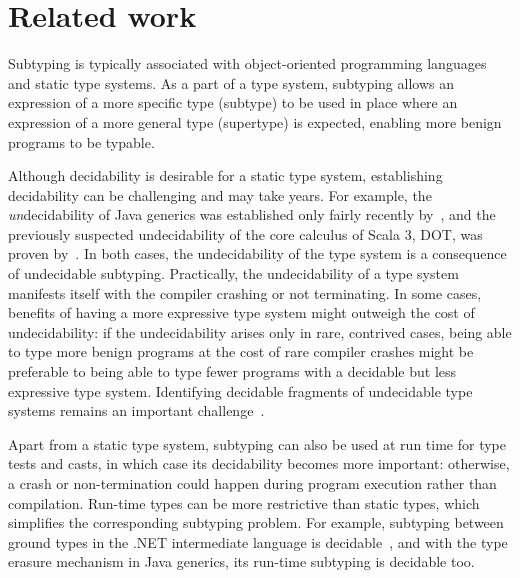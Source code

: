 \chapter{Related work}\label{chap:5}

Subtyping is typically associated with object-oriented programming languages and
static type systems. As a part of a type system, subtyping allows
an expression of a more specific type (subtype) to be used in place
where an expression of a more general type (supertype) is expected,
enabling more benign programs to be typable.

Although decidability is desirable for a static type system, establishing
decidability can be challenging and may take years.
For example, the \emph{un}decidability of Java generics was 
established only fairly recently by~\citet{grigore:java-undec:2017},
and the previously suspected undecidability of the core calculus of Scala 3,
DOT, was proven by~\citet{hu:dot-undec:2020}.
In both cases, the undecidability of the type system is a consequence of
undecidable subtyping.
Practically, the undecidability of a type system manifests itself with
the compiler crashing or not terminating. In some cases,
benefits of having a more expressive type system might outweigh the cost of
undecidability: if the undecidability arises only in rare, contrived cases,
being able to type more benign programs at the cost of rare compiler crashes
might be preferable to being able to type fewer programs
with a decidable but less expressive type system.
Identifying decidable fragments of undecidable type systems remains
an important challenge~\cite{mackay:path-dep-dec:2020,
hu:dot-undec:2020,mackay:bound-poly-sub-dec:2020,kennedy:nom-sub-var-dec:2007}.

Apart from a static type system,
subtyping can also be used at run time for type tests and casts,
in which case its decidability becomes more important: otherwise, a crash or
non-termination could happen during program execution rather than compilation.
Run-time types can be more restrictive than static types, which
simplifies the corresponding subtyping problem.
For example, subtyping between ground types in the .NET intermediate
language is decidable~\cite{kennedy:nom-sub-var-dec:2007},
and with the type erasure mechanism in Java generics,
its run-time subtyping is decidable too.




